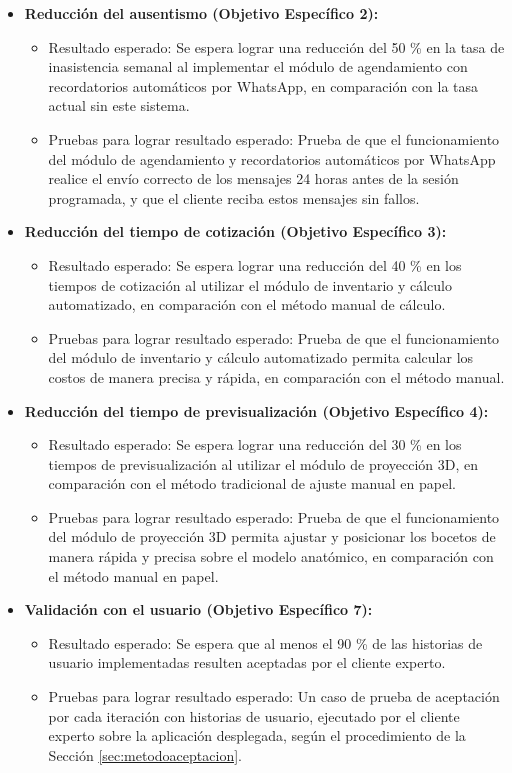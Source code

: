 \documentclass[12pt,letterpaper,oneside]{report}
\begin{document}
\begin{itemize}
  \item \textbf{Reducción del ausentismo (Objetivo Específico 2):}
  \begin{itemize}
    \item Resultado esperado: Se espera lograr una reducción del 50 \% en la tasa de inasistencia semanal al implementar el módulo de agendamiento con recordatorios automáticos por WhatsApp, en comparación con la tasa actual sin este sistema.
    \item Pruebas para lograr resultado esperado: Prueba de que el funcionamiento del módulo de agendamiento y recordatorios automáticos por WhatsApp realice el envío correcto de los mensajes 24 horas antes de la sesión programada, y que el cliente reciba estos mensajes sin fallos.
  \end{itemize}
  \item \textbf{Reducción del tiempo de cotización (Objetivo Específico 3):}
  \begin{itemize}
    \item Resultado esperado: Se espera lograr una reducción del 40 \% en los tiempos de cotización al utilizar el módulo de inventario y cálculo automatizado, en comparación con el método manual de cálculo.
    \item Pruebas para lograr resultado esperado: Prueba de que el funcionamiento del módulo de inventario y cálculo automatizado permita calcular los costos de manera precisa y rápida, en comparación con el método manual.
  \end{itemize}
  \item \textbf{Reducción del tiempo de previsualización (Objetivo Específico 4):}
  \begin{itemize}
    \item Resultado esperado: Se espera lograr una reducción del 30 \% en los tiempos de previsualización al utilizar el módulo de proyección 3D, en comparación con el método tradicional de ajuste manual en papel.
    \item Pruebas para lograr resultado esperado: Prueba de que el funcionamiento del módulo de proyección 3D permita ajustar y posicionar los bocetos de manera rápida y precisa sobre el modelo anatómico, en comparación con el método manual en papel.
  \end{itemize}
  \item \textbf{Validación con el usuario (Objetivo Específico 7):}
  \begin{itemize}
    \item Resultado esperado: Se espera que al menos el 90 \% de las historias de usuario implementadas resulten aceptadas por el cliente experto.
    \item Pruebas para lograr resultado esperado: Un caso de prueba de aceptación por cada iteración con historias de usuario, ejecutado por el cliente experto sobre la aplicación desplegada, según el procedimiento de la Sección \ref{sec:metodoaceptacion}.
  \end{itemize}
\end{itemize}
\end{document}
